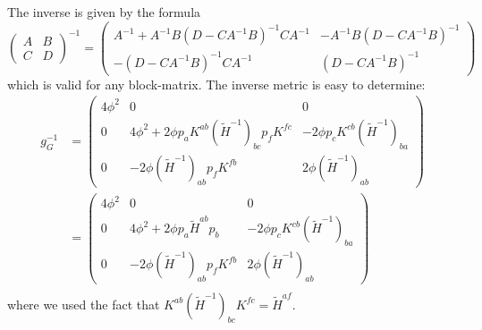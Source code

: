\documentclass[parskip=half]{scrartcl}
\begin{document}
The inverse is given by the formula
\begin{equation*}
	\begin{pmatrix}
		A & B\\
		C & D
	\end{pmatrix}^{-1}
	=
	\begin{pmatrix}
		A^{-1}+A^{-1}B(D-CA^{-1}B)^{-1}CA^{-1} & -A^{-1}B (D-CA^{-1}B)^{-1}\\
		-(D-CA^{-1}B)^{-1}CA^{-1} & (D-CA^{-1}B)^{-1}
	\end{pmatrix}
\end{equation*}
which is valid for any block-matrix. The inverse metric is easy to determine:
\begin{align*}
	g^{-1}_G&=
	\begin{pmatrix}
		4\phi^2 & 0 & 0 \\
		0& 4\phi^2+2\phi p_a K^{ab}(\tilde H^{-1})_{bc}p_f K^{fc} & -2\phi p_c K^{cb}(\tilde H^{-1})_{ba} \\
		0& -2\phi (\tilde H^{-1})_{ab}p_f K^{fb} & 2\phi (\tilde H^{-1})_{ab}
	\end{pmatrix}\\
	&=
	\begin{pmatrix}
		4\phi^2 & 0 & 0\\
		0 & 4\phi^2+2\phi p_a \tilde H^{ab} p_b & -2\phi p_c K^{cb}(\tilde H^{-1})_{ba} \\
		0 & -2\phi (\tilde H^{-1})_{ab}p_f K^{fb} & 2\phi (\tilde H^{-1})_{ab}
	\end{pmatrix}\\
\end{align*}
where we used the fact that $K^{ab}(\tilde H^{-1})_{bc}K^{fc}=\tilde H^{af}$.
%
\end{document}
